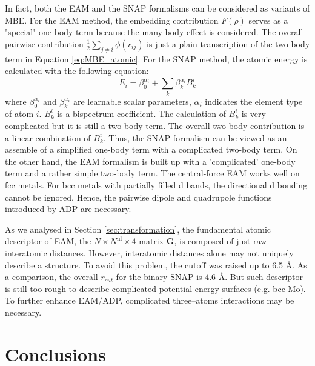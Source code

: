 \documentclass[final,3p,times]{elsarticle}
\begin{document}
In fact, both the EAM and the SNAP formalisms can be considered as variants of 
MBE. For the EAM method, the embedding contribution $F(\rho)$ 
serves as a "special" one-body term because the many-body effect is considered.
The overall pairwise contribution $\frac{1}{2}\sum_{j\ne i}{\phi(r_{ij})}$ is 
just a plain transcription of the two-body term in Equation \ref{eq:MBE_atomic}. 
For the SNAP method, the atomic energy is calculated with the following 
equation: 
\begin{equation}
\label{eq:snap_formalism}
E_i = \beta_{0}^{\alpha_{i}} + \sum_{k}{\beta_{k}^{\alpha_{i}}B_{k}^i}
\end{equation} 
where $\beta_{0}^{\alpha_i}$ and $\beta_{k}^{\alpha_i}$ are learnable scalar
parameters, $\alpha_i$ indicates the element type of atom $i$. $B_{k}^{i}$ is a 
bispectrum coefficient. The calculation of $B_{k}^{i}$ is very complicated 
\cite{SNAP_Algo} but it is still a two-body term. The overall two-body 
contribution is a linear combination of $B_{k}^{i}$. Thus, the SNAP formalism 
can be viewed as an assemble of a simplified one-body term with a complicated 
two-body term. 
On the other hand, the EAM formalism is built up with a 'complicated' one-body 
term and a rather simple two-body term. The central-force EAM works well on fcc 
metals. For bcc metals with partially filled d bands, the directional d bonding 
cannot be ignored. Hence, the pairwise dipole and quadrupole functions 
introduced by ADP are necessary.

As we analysed in Section \ref{sec:transformation}, the fundamental atomic 
descriptor of EAM, the $N \times N^{\mathrm{nl}} \times 4$ matrix $\mathbf{G}$, 
is composed of just raw interatomic distances. However, interatomic distances
alone may not uniquely describe a structure. To avoid this problem, the cutoff 
was raised up to 6.5 \AA. As a comparison, the overall $r_{cut}$ for the binary 
SNAP is 4.6 \AA. But such descriptor is still too rough to describe complicated 
potential energy surfaces (e.g. bcc Mo). To further enhance EAM/ADP, complicated
three--atoms interactions may be necessary.

% 
%
\section{Conclusions}
\label{sec:conclusions}
\end{document}
